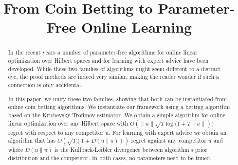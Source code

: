 \documentclass{colt2016} %
\title{From Coin Betting to Parameter-Free Online Learning}
\newcommand{\KL}[2]{D\left({#1}\middle\|{#2}\right)}  %
\begin{document}
\maketitle

\begin{abstract}
In the recent years a number of parameter-free algorithms for online linear
optimization over Hilbert spaces and for learning with expert advice have been
developed. While these two families of algorithms might seem different to a
distract eye, the proof methods are indeed very similar, making the reader
wonder if such a connection is only accidental.

In this paper, we unify these two families, showing that both can be
instantiated from online coin betting algorithms. We instantiate our framework
using a betting algorithm based on the Krichevsky-Trofimov estimator. We obtain
a simple algorithm for online linear optimization over any Hilbert space with
$O(\|u\|\sqrt{T \log(1+T\|u\|}))$ regret with respect to any competitor $u$.
For learning with expert advice we obtain an algorithm that has $O(\sqrt{T (1 +
\KL{u}{\pi})})$ regret against any competitor $u$ and where $\KL{u}{\pi}$ is
the Kullback-Leibler divergence between algorithm's prior distribution and the
competitor. In both cases, no parameters need to be tuned.
\end{abstract}











\appendix





\end{document}
